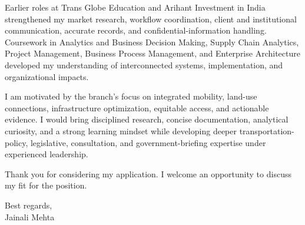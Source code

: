 \documentclass[letterpaper,10pt]{article}
\begin{document}
Earlier roles at Trans Globe Education and Arihant Investment in India strengthened my market research, workflow coordination, client and institutional communication, accurate records, and confidential-information handling. Coursework in Analytics and Business Decision Making, Supply Chain Analytics, Project Management, Business Process Management, and Enterprise Architecture developed my understanding of interconnected systems, implementation, and organizational impacts.

I am motivated by the branch's focus on integrated mobility, land-use connections, infrastructure optimization, equitable access, and actionable evidence. I would bring disciplined research, concise documentation, analytical curiosity, and a strong learning mindset while developing deeper transportation-policy, legislative, consultation, and government-briefing expertise under experienced leadership.

Thank you for considering my application. I welcome an opportunity to discuss my fit for the position.

Best regards,\\[8pt]
Jainali Mehta
\end{document}
